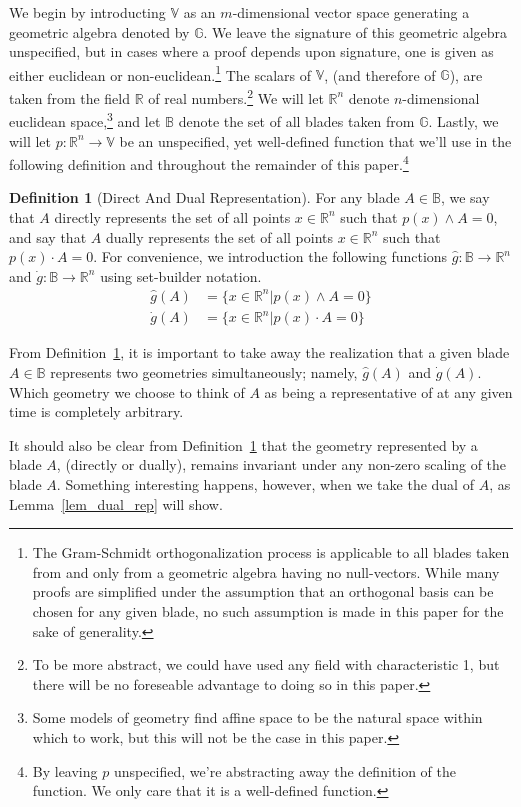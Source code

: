 \documentclass{birkjour}
\theoremstyle{definition}
\newtheorem{defn}[thm]{Definition}
\theoremstyle{remark}
\numberwithin{equation}{section}
\newcommand{\R}{\mathbb{R}}
\newcommand{\B}{\mathbb{B}}
\newcommand{\G}{\mathbb{G}}
\newcommand{\V}{\mathbb{V}}
\newcommand{\gd}{\dot{g}}
\newcommand{\gh}{\hat{g}}
\begin{document}
We begin by introducting $\V$ as an $m$-dimensional vector
space generating a geometric algebra denoted by $\G$.  We leave the signature of this geometric algebra
unspecified, but in cases where a proof depends upon signature, one is given as either
euclidean or non-euclidean.\footnote{The Gram-Schmidt orthogonalization process is applicable
to all blades taken from and only from a geometric algebra having no null-vectors.  While many proofs
are simplified under the assumption that an orthogonal basis can be chosen for any given blade, no such
assumption is made in this paper for the sake of generality.}
The scalars of $\V$, (and therefore of $\G$), are taken from the field $\R$ of real numbers.\footnote{To be more abstract,
we could have used any field with characteristic 1, but there will be no foreseable advantage to doing so in this paper.}
We will let $\R^n$ denote $n$-dimensional euclidean space,\footnote{Some models of geometry find affine space to be the natural
space within which to work, but this will not be the case in this paper.} and let $\B$ denote the set of all blades taken from $\G$.
Lastly, we will let $p:\R^n\to\V$ be an unspecified, yet well-defined function that we'll use in the following definition and
throughout the remainder of this paper.\footnote{By leaving $p$ unspecified, we're abstracting away the definition of the function.
We only care that it is a well-defined function.}

\begin{defn}[Direct And Dual Representation]\label{def_blade_rep_geo}
For any blade $A\in\B$, we say that $A$ directly represents the set of all points $x\in\R^n$ such that
$p(x)\wedge A=0$, and say that $A$ dually represents the set of all points $x\in\R^n$ such that
$p(x)\cdot A=0$.  For convenience, we introduction the following functions $\gh:\B\to\R^n$ and $\gd:\B\to\R^n$
using set-builder notation.
\begin{align*}
\gh(A) &= \{x\in\R^n|p(x)\wedge A=0\} \\
\gd(A) &= \{x\in\R^n|p(x)\cdot A=0\}
\end{align*}
\end{defn}
From Definition~\ref{def_blade_rep_geo}, it is important to take away the realization that a given blade $A\in\B$ represents two geometries
simultaneously; namely, $\gh(A)$ and $\gd(A)$.  Which geometry we choose to think of $A$ as being a representative of at any given time is completely
arbitrary.

It should also be clear from Definition~\ref{def_blade_rep_geo} that the geometry represented by a blade $A$, (directly or dually), remains invariant
under any non-zero scaling of the blade $A$.  Something interesting happens, however, when we take the dual of $A$, as Lemma~\ref{lem_dual_rep} will show.
\end{document}

